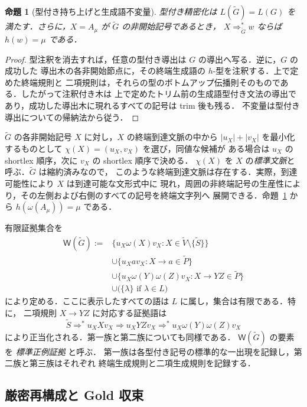 \documentclass[11pt,a4paper]{ltjsarticle}
\newtheorem{proposition}[theorem]{命題}
\theoremstyle{remark}
\theoremstyle{plain}
\newcommand{\WitnessSet}{\mathsf{W}}
\begin{document}
\begin{proposition}[型付き持ち上げと生成語不変量]\label{prop:typed-core}
型付き精密化は $L(\widetilde G)=L(G)$ を満たす．さらに，$X=A_\mu$ が
$\widetilde G$ の非開始記号であるとき，
$X\Rightarrow_{\widetilde G}^*w$ ならば $h(w)=\mu$ である．
\end{proposition}
\begin{proof}
型注釈を消去すれば，任意の型付き導出は $G$ の導出へ写る．逆に，$G$ の成功した
導出木の各非開始節点に，その終端生成語の $h$-型を注釈する．上で定めた終端規則と
二項規則は，それらの型のボトムアップ伝播則そのものである．したがって注釈付き木は
上で定めたトリム前の生成語型付き文法の導出であり，成功した導出木に現れるすべての記号は trim 後も残る．
不変量は型付き導出についての帰納法から従う．
\end{proof}

$\widetilde G$ の各非開始記号 $X$ に対し，$X$ の終端到達文脈の中から
$|u_X|+|v_X|$ を最小化するものとして $\chi(X)=(u_X,v_X)$ を選び，同値な候補が
ある場合は $u_X$ の shortlex 順序，次に $v_X$ の shortlex 順序で決める．
$\chi(X)$ を $X$ の\emph{標準文脈}と呼ぶ．$\widetilde G$ は縮約済みなので，
このような終端到達文脈は存在する．実際，到達可能性により $X$ は到達可能な文形式中に
現れ，周囲の非終端記号の生産性により，その左側および右側のすべての記号を終端文字列へ
展開できる．命題~\ref{prop:typed-core} から $h(\omega(A_\mu))=\mu$ である．

有限証拠集合を
\begin{equation}\label{eq:W}
\begin{split}
\WitnessSet(\widetilde G):={}&
 \{u_X\omega(X)v_X:X\in\widetilde V\setminus\{\widetilde S\}\}\\
&\cup\{u_Xav_X:X\to a\in\widetilde P\}\\
&\cup\{u_X\omega(Y)\omega(Z)v_X:X\to YZ\in\widetilde P\}\\
&\cup\bigl(\{\lambda\}\text{ if }\lambda\in L\bigr)
\end{split}
\end{equation}
により定める．ここに表示したすべての語は $L$ に属し，集合は有限である．特に，
二項規則 $X\to YZ$ に対応する証拠語は
\[
\widetilde S\Rightarrow^*u_XXv_X\Rightarrow u_XYZv_X
\Rightarrow^*u_X\omega(Y)\omega(Z)v_X
\]
により正当化される．第一族と第二族についても同様である．
$\WitnessSet(\widetilde G)$ の要素を \emph{標準正例証拠} と呼ぶ．
第一族は各型付き記号の標準的な一出現を記録し，第二族と第三族はそれぞれ
終端生成規則と二項生成規則を記録する．

\subsection{厳密再構成と Gold 収束}
\end{document}
